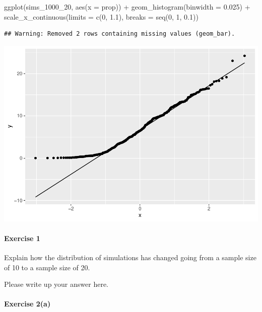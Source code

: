 \documentclass[
]{book}
\newenvironment{Shaded}{\begin{snugshade}}{\end{snugshade}}
\newcommand{\AttributeTok}[1]{\textcolor[rgb]{0.77,0.63,0.00}{#1}}
\newcommand{\DecValTok}[1]{\textcolor[rgb]{0.00,0.00,0.81}{#1}}
\newcommand{\FloatTok}[1]{\textcolor[rgb]{0.00,0.00,0.81}{#1}}
\newcommand{\FunctionTok}[1]{\textcolor[rgb]{0.00,0.00,0.00}{#1}}
\newcommand{\NormalTok}[1]{#1}
\newcommand{\SpecialCharTok}[1]{\textcolor[rgb]{0.00,0.00,0.00}{#1}}
\begin{document}
\begin{Shaded}
\begin{Highlighting}[]
\FunctionTok{ggplot}\NormalTok{(sims\_1000\_20, }\FunctionTok{aes}\NormalTok{(}\AttributeTok{x =}\NormalTok{ prop)) }\SpecialCharTok{+}
    \FunctionTok{geom\_histogram}\NormalTok{(}\AttributeTok{binwidth =} \FloatTok{0.025}\NormalTok{) }\SpecialCharTok{+}
    \FunctionTok{scale\_x\_continuous}\NormalTok{(}\AttributeTok{limits =} \FunctionTok{c}\NormalTok{(}\DecValTok{0}\NormalTok{, }\FloatTok{1.1}\NormalTok{),}
                       \AttributeTok{breaks =} \FunctionTok{seq}\NormalTok{(}\DecValTok{0}\NormalTok{, }\DecValTok{1}\NormalTok{, }\FloatTok{0.1}\NormalTok{))}
\end{Highlighting}
\end{Shaded}

\begin{verbatim}
## Warning: Removed 2 rows containing missing values (geom_bar).
\end{verbatim}

\includegraphics{intro_stats_files/figure-latex/unnamed-chunk-370-1.pdf}

\hypertarget{exercise-1-10}{%
\paragraph*{Exercise 1}\label{exercise-1-10}}

Explain how the distribution of simulations has changed going from a sample size of 10 to a sample size of 20.

Please write up your answer here.

\hypertarget{exercise-2a-3}{%
\paragraph*{Exercise 2(a)}\label{exercise-2a-3}}
\end{document}
